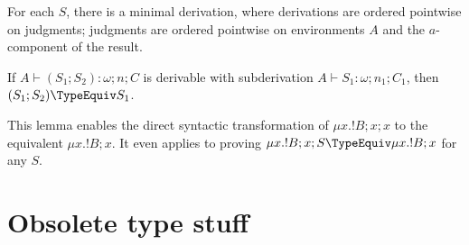 \begin{lemma}
  For each $S$, there is a minimal derivation, where derivations are ordered pointwise on judgments;
  judgments are ordered pointwise on environments $A$ and the $a$-component of the result.
\end{lemma}

\begin{lemma}
  If $A \vdash (S_1; S_2) : \omega; n; C$ is derivable with subderivation $A \vdash S_1 : \omega;
  n_1; C_1$, then $(S_1;S_2) \TypeEquiv S_1$.
\end{lemma}

This lemma enables the direct syntactic transformation of $\mu x.{!B};x;x$ to the equivalent $\mu
x.{!B}; x$. It even applies to proving $\mu x.{!B}; x; S \TypeEquiv \mu x.{!B}; x$ for any $S$.


\section{Obsolete type stuff}


